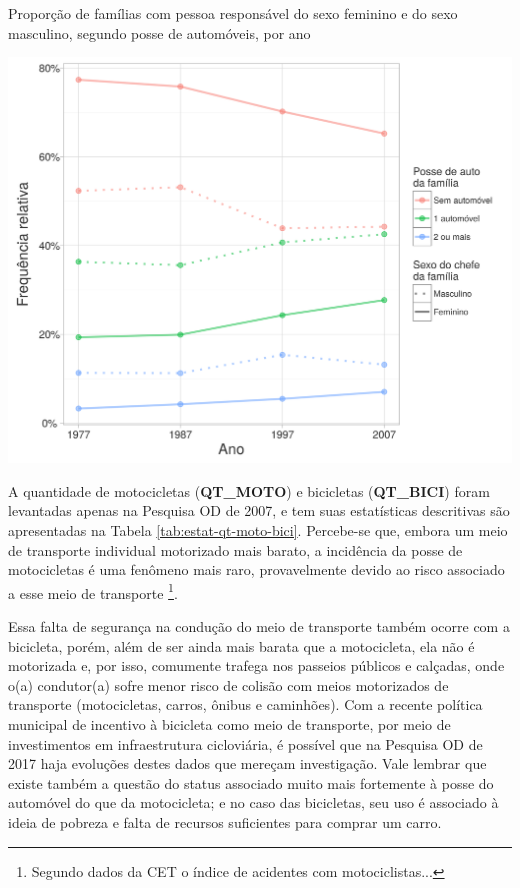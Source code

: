 \begin{grafico}[htb]%
    \caption{\label{graf:autos-sit-fam-sexo} Proporção de famílias com pessoa responsável do sexo feminino e do sexo masculino, segundo posse de automóveis, por ano}%
    \begin{center}%
        \includegraphics[width=1\textwidth]{./imagens/autos-sit-fam-sexo.png}%
    \end{center}%
\end{grafico}%


A quantidade de motocicletas (\textbf{QT_MOTO}) e bicicletas (\textbf{QT_BICI}) foram levantadas apenas na Pesquisa OD de 2007, e tem suas estatísticas descritivas são apresentadas na Tabela \ref{tab:estat-qt-moto-bici}.
Percebe-se que, embora um meio de transporte individual motorizado mais barato, a incidência da posse de motocicletas é uma fenômeno mais raro, provavelmente devido ao risco associado a esse meio de transporte
\footnote{Segundo dados da CET o índice de acidentes com motociclistas...}. 

Essa falta de segurança na condução do meio de transporte também ocorre com a bicicleta, porém, além de ser ainda mais barata que a motocicleta, ela não é motorizada e, por isso, comumente trafega nos passeios públicos e calçadas, onde o(a) condutor(a) sofre menor risco de colisão com meios motorizados de transporte (motocicletas, carros, ônibus e caminhões). Com a recente política municipal de incentivo à bicicleta como meio de transporte, por meio de investimentos em infraestrutura cicloviária, é possível que na Pesquisa OD de 2017 haja evoluções destes dados que mereçam investigação.
Vale lembrar que existe também a questão do status associado muito mais fortemente à posse do automóvel do que da motocicleta; e no caso das bicicletas, seu uso é associado à ideia de pobreza e falta de recursos suficientes para comprar um carro.

